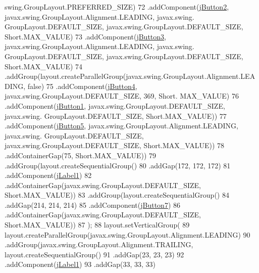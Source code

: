 \begin{DoxyCode}
      swing.GroupLayout.PREFERRED\_SIZE)
72                     .addComponent(\mbox{\hyperlink{classinterfacessoguar_1_1presoscu07_a35492e43d1e9d8728a881acf30bff4c3}{jButton2}}, javax.swing.GroupLayout.Alignment.LEADING, javax.swing.
      GroupLayout.DEFAULT\_SIZE, javax.swing.GroupLayout.DEFAULT\_SIZE, Short.MAX\_VALUE)
73                     .addComponent(\mbox{\hyperlink{classinterfacessoguar_1_1presoscu07_ab74517a901b30e28dab9f184845d8e00}{jButton3}}, javax.swing.GroupLayout.Alignment.LEADING, javax.swing.
      GroupLayout.DEFAULT\_SIZE, javax.swing.GroupLayout.DEFAULT\_SIZE, Short.MAX\_VALUE)
74                     .addGroup(layout.createParallelGroup(javax.swing.GroupLayout.Alignment.LEADING, \textcolor{keyword}{false})
75                         .addComponent(\mbox{\hyperlink{classinterfacessoguar_1_1presoscu07_a59d84610b52e55806c464f05ac4d1f9a}{jButton4}}, javax.swing.GroupLayout.DEFAULT\_SIZE, 369, Short.
      MAX\_VALUE)
76                         .addComponent(\mbox{\hyperlink{classinterfacessoguar_1_1presoscu07_a32fac137cfd5dc354e4cfa6ee0530f76}{jButton1}}, javax.swing.GroupLayout.DEFAULT\_SIZE, javax.swing.
      GroupLayout.DEFAULT\_SIZE, Short.MAX\_VALUE))
77                     .addComponent(\mbox{\hyperlink{classinterfacessoguar_1_1presoscu07_a235597181f1514e6ad0aa24146a9ea4a}{jButton5}}, javax.swing.GroupLayout.Alignment.LEADING, javax.swing.
      GroupLayout.DEFAULT\_SIZE, javax.swing.GroupLayout.DEFAULT\_SIZE, Short.MAX\_VALUE))
78                 .addContainerGap(75, Short.MAX\_VALUE))
79             .addGroup(layout.createSequentialGroup()
80                 .addGap(172, 172, 172)
81                 .addComponent(\mbox{\hyperlink{classinterfacessoguar_1_1presoscu07_a085ba36143328d4629072e229e1b5acb}{jLabel1}})
82                 .addContainerGap(javax.swing.GroupLayout.DEFAULT\_SIZE, Short.MAX\_VALUE))
83             .addGroup(layout.createSequentialGroup()
84                 .addGap(214, 214, 214)
85                 .addComponent(\mbox{\hyperlink{classinterfacessoguar_1_1presoscu07_a3f67db575069b29512c7ce7b0f2e8062}{jButton7}})
86                 .addContainerGap(javax.swing.GroupLayout.DEFAULT\_SIZE, Short.MAX\_VALUE))
87         );
88         layout.setVerticalGroup(
89             layout.createParallelGroup(javax.swing.GroupLayout.Alignment.LEADING)
90             .addGroup(javax.swing.GroupLayout.Alignment.TRAILING, layout.createSequentialGroup()
91                 .addGap(23, 23, 23)
92                 .addComponent(\mbox{\hyperlink{classinterfacessoguar_1_1presoscu07_a085ba36143328d4629072e229e1b5acb}{jLabel1}})
93                 .addGap(33, 33, 33)

\end{DoxyCode}
